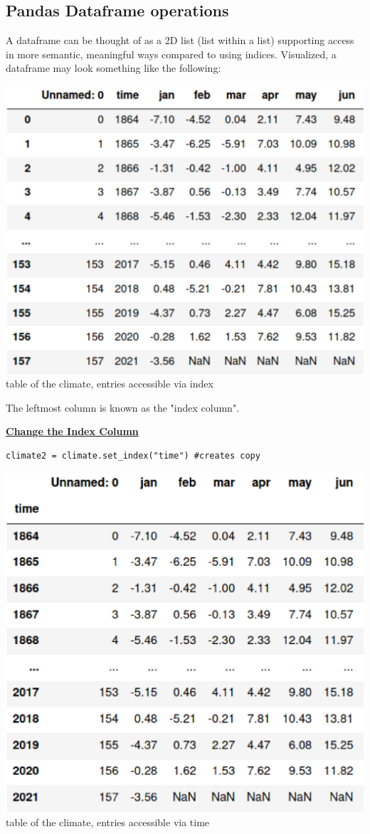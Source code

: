 \subsection*{Pandas Dataframe operations}
A dataframe can be thought of as a 2D list (list within a list) supporting access in more semantic, meaningful ways compared to using indices. Visualized, a dataframe may look something like the following: 

{\centering
\includegraphics[width=0.8\linewidth]{src/10_pandas/images/pd_dataframe_index.png}\\
table of the climate, entries accessible via index \par}

The leftmost column is known as the "index column".  

{\centering\underline{\textbf{Change the Index Column}} \par}
\begin{lstlisting}
climate2 = climate.set_index("time") #creates copy
\end{lstlisting}
{\centering
\includegraphics[width = 0.8\linewidth]{src/10_pandas/images/pd_dataframe_time.png}\\
table of the climate, entries accessible via time \par}

